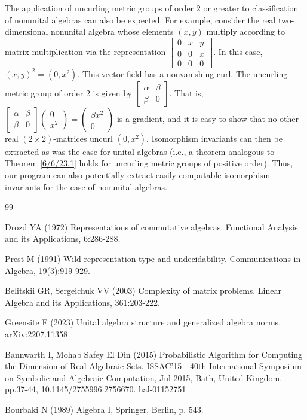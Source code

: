 \documentclass{amsart}
\numberwithin{equation}{section}
\theoremstyle{definition}
\numberwithin{theorem}{section}
\begin{document}
The application of uncurling metric groups of order $2$ or greater  to classification of nonunital algebras can also be expected.  For example, consider the real two-dimensional nonunital algebra whose elements $(x,y)$ multiply according to matrix multiplication via the representation
 $\left[
\begin{array}{ccccc}
0 & x & y   \\
0 & 0 & x \\
0 & 0 & 0  
\end{array}
\right] $.  In this case, $(x,y)^2 = (0,x^2)$.  This vector field has a nonvanishing curl.  The uncurling metric group of order 2 is given by $\left[
\begin{array}{ccccc}
\alpha & \beta    \\
\beta & 0   
\end{array}
\right]$.
  That is,  $\left[
\begin{array}{ccccc}
\alpha & \beta    \\
\beta & 0   
\end{array}
\right] \left(
\begin{array}{ccccc}
0   \\
x^2 
\end{array}
\right) =   \left(
\begin{array}{ccccc}
\beta x^2   \\
0 
\end{array}
\right)$ is a gradient, and it is easy to show that no other real $(2\times 2)$-matrices uncurl $(0,x^2)$.   Isomorphism invariants can then be extracted as was the case for unital algebras (i.e., a theorem analogous to Theorem \ref{6/6/23.1} holds for uncurling metric groups of positive order).  Thus, our program can also potentially extract easily computable isomorphism invariants for the case of nonunital algebras.
 
   \begin{thebibliography}{99}
   
     Drozd YA (1972) Representations of commutative algebras. Functional Analysis and its Applications, 6:286-288.
   
        Prest M (1991) Wild representation type and undecidability.  Communications in Algebra, 19(3):919-929.
       
        Belitskii GR, Sergeichuk VV (2003) Complexity of matrix problems.  Linear Algebra and its Applications, 361:203-222.
       
         Greensite F (2023) Unital algebra structure and generalized algebra norms, arXiv:2207.11358
               
     Bannwarth I, Mohab Safey El Din (2015) Probabilistic Algorithm for Computing the Dimension of Real Algebraic Sets. ISSAC’15 - 40th International Symposium on Symbolic and Algebraic Computation, Jul 2015, Bath, United Kingdom. pp.37-44, 10.1145/2755996.2756670. hal-01152751
 
   Bourbaki N (1989) Algebra I, Springer, Berlin, p. 543.

       
      \end{thebibliography}
   
   
\end{document}
